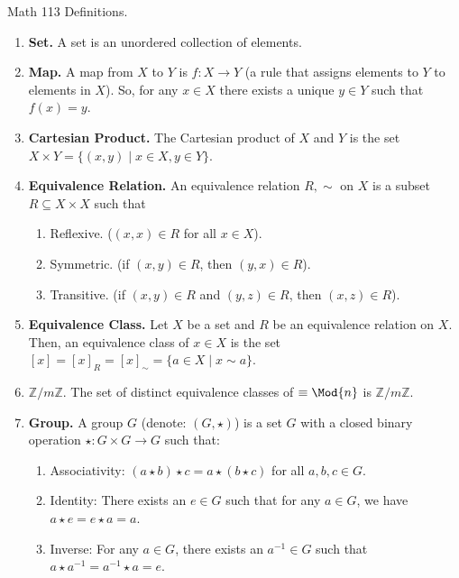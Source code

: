 

\begin{center}
    Math 113 Definitions. 
\end{center}

\begin{enumerate}
    \item \textbf{Set. } A set is an unordered collection of elements. 
    \item \textbf{Map. } A map from $X$ to $Y$ is $f: X \to Y$ (a rule that assigns elements to $Y$ to elements in $X$). So, for any $x \in X$ there exists a unique $y \in Y$ such that $f(x)=y$. 
    \item \textbf{Cartesian Product. } The Cartesian product of $X$ and $Y$ is the set $X \times Y = \{(x,y) \mid x \in X, y \in Y\}$. 
    \item \textbf{Equivalence Relation. } An equivalence relation $R,\sim$ on $X$ is a subset $R \subseteq X \times X$ such that
    \begin{enumerate}
        \item Reflexive. ($(x,x) \in R$ for all $x \in X$). 
        \item Symmetric. (if $(x,y) \in R$, then $(y,x) \in R$). 
        \item Transitive. (if $(x,y) \in R$ and $(y,z) \in R$, then $(x,z) \in R$). 
    \end{enumerate}
    \item \textbf{Equivalence Class. } Let $X$ be a set and $R$ be an equivalence relation on $X$. Then, an equivalence class of $x \in  X$ is the set $[x]=[x]_R=[x]_{\sim} = \{a \in X \mid x \sim a\}$. 
    \item \textbf{$\mathbb{Z}/m\mathbb{Z}. $} The set of distinct equivalence classes of $\equiv \Mod{n}$ is $\mathbb{Z}/m\mathbb{Z}$.
	\item \textbf{Group. } A group $G$ (denote: $(G,\star)$) is a set $G$ with a closed binary operation $\star: G \times G \to G$ such that: 
	\begin{enumerate}
		\item Associativity: $(a \star b) \star c = a \star (b \star c)$ for all $a,b,c \in G$. 
		\item Identity: There exists an $e \in G$ such that for any $a \in G$, we have $a \star e = e \star a = a$. 
		\item Inverse: For any $a \in G$, there exists an $a^{-1} \in G$ such that $a \star a^{-1} = a^{-1} \star a = e$. 
	\end{enumerate}

\end{enumerate}
